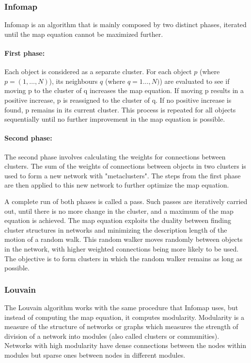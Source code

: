 \documentclass[10pt,twocolumn,letterpaper]{article}
\begin{document}
\subsubsection{Infomap}

Infomap is an algorithm that is mainly composed by two distinct phases, iterated until the map equation cannot be maximized further. 
\paragraph{First phase:}
Each object is considered as a separate cluster. For each object $p$ (where $p=(1,\dots,N)$), its neighbours $q$ (where $q=1\dots,N)$) are evaluated to see if moving p to the cluster of q increases the map equation. If moving p results in a positive increase, p is reassigned to the cluster of q. If no positive increase is found, p remains in its current cluster. This process is repeated for all objects sequentially until no further improvement in the map equation is possible.
\paragraph{Second phase:}
The second phase involves calculating the weights for connections between clusters. The sum of the weights of connections between objects in two clusters is used to form a new network with "metaclusters". The steps from the first phase are then applied to this new network to further optimize the map equation.

A complete run of both phases is called a pass. Such passes are iteratively carried out, until there is no more change in the cluster, and a maximum of the map equation is achieved.
The map equation exploits the duality between finding cluster structures in networks and minimizing the description length of the motion of a random walk. This random walker moves randomly between objects in the network, with higher weighted connections being more likely to be used. The objective is to form clusters in which the random walker remains as long as possible.


\subsubsection{Louvain}

The Louvain algorithm works with the same procedure that Infomap uses, but instead of computing the map equation, it computes modularity.
Modularity is a measure of the structure of networks or graphs which measures the strength of division of a network into modules (also called clusters or communities). Networks with high modularity have dense connections between the nodes within modules but sparse ones between nodes in different modules.
\end{document}
